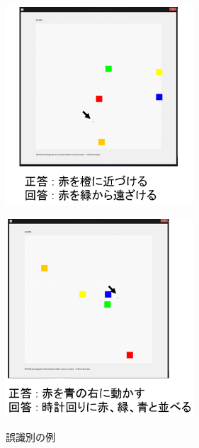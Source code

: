 \begin{figure}[h]
	\centering
	\begin{minipage}[t]{.47\textwidth}
		\centering
		\includegraphics[width=7cm]{figure4_a.png} \\ %
		\label{subfigure:failure1}    
	\end{minipage}
	\begin{minipage}[t]{.47\textwidth}
		\centering
		\includegraphics[width=7cm]{figure4_b.png} \\ %
		\label{subfigure:failure2}
	\end{minipage}
	\caption{誤識別の例}
	\label{figure:failure}
\end{figure}
